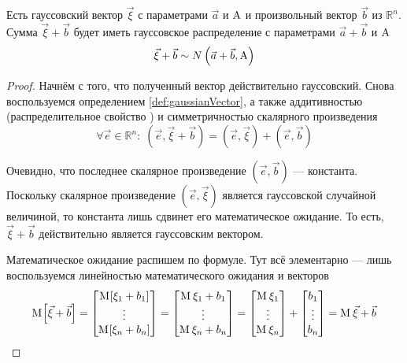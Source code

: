 \begin{lemma}\label{lemma:gaussPlusVec}
    Есть гауссовский вектор $\vec{\xi}$ с параметрами $\vec{a}$ и $\mathrm{A}$
    и произвольный вектор $\vec{b}$ из $\mathbb{R}^n$.
    Сумма $\vec{\xi} + \vec{b}$ будет иметь гауссовское распределение с
    параметрами $\vec{a} + \vec{b}$ и $\mathrm{A}$
    $$\vec{\xi} + \vec{b} \sim N\left( \vec{a} + \vec{b}, \mathrm{A} \right)$$
\end{lemma}
\begin{proof}
    Начнём с того, что полученный вектор действительно гауссовский.
    Снова воспользуемся определением \ref{def:gaussianVector}, а также
    аддитивностью (распределительное свойство \cite[с.~82]{VoevodinLA})
    и симметричностью скалярного произведения
    $$\forall \vec{e} \in \mathbb{R}^n:\;
        \left( \vec{e}, \vec{\xi} + \vec{b} \right)
            = \left( \vec{e}, \vec{\xi} \right)
                + \left( \vec{e}, \vec{b} \right)$$

    Очевидно, что последнее скалярное произведение
    $\left( \vec{e}, \vec{b} \right)$ --- константа. Поскольку скалярное
    произведение $\left( \vec{e}, \vec{\xi} \right)$ является гауссовской
    случайной величиной, то константа лишь сдвинет его математическое
    ожидание. То есть, $\vec{\xi} + \vec{b}$ действительно является
    гауссовским вектором.

    Математическое ожидание распишем по формуле. Тут всё элементарно --- лишь
    воспользуемся линейностью математического ожидания и векторов
    $$\mathrm{M}_{}\!\left[ \vec{\xi} + \vec{b} \right]
        =   \begin{bmatrix}
                \mathrm{M}_{}\!\left[ \xi_1 + b_1 \right] \\ \vdots \\ \mathrm{M}_{}\!\left[ \xi_n + b_n \right]
            \end{bmatrix}
        =   \begin{bmatrix}
                \mathrm{M}_{}\,\xi_1 + b_1 \\ \vdots \\ \mathrm{M}_{}\,\xi_n + b_n
            \end{bmatrix}
        =   \begin{bmatrix}
                \mathrm{M}_{}\,\xi_1 \\ \vdots \\ \mathrm{M}_{}\,\xi_n
            \end{bmatrix}
            +
            \begin{bmatrix}
                b_1 \\ \vdots \\ b_n
            \end{bmatrix}
        = \mathrm{M}_{}\,\vec{\xi} + \vec{b}$$


\end{proof}
